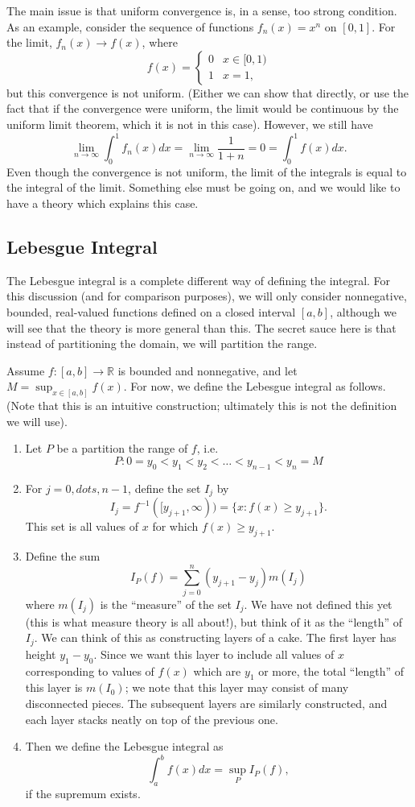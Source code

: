 \documentclass[12pt]{amsart}         %
\theoremstyle{remark}
\newcommand{\R}{\mathbb{R}}
\begin{document}
The main issue is that uniform convergence is, in a sense, too strong condition. As an example, consider the sequence of functions $f_n(x) = x^n$ on $[0, 1]$. For the limit, $f_n(x) \rightarrow f(x)$, where
\[
f(x) = \begin{cases}
0 & x \in [0, 1) \\
1 & x = 1,
\end{cases}
\]
but this convergence is not uniform. (Either we can show that directly, or use the fact that if the convergence were uniform, the limit would be continuous by the uniform limit theorem, which it is not in this case). However, we still have
\[
\lim_{n \rightarrow \infty} \int_0^1 f_n(x) dx = \lim_{n \rightarrow \infty} \frac{1}{1+n} = 0 = \int_0^1 f(x) dx.
\]
Even though the convergence is not uniform, the limit of the integrals is equal to the integral of the limit. Something else must be going on, and we would like to have a theory which explains this case.

\subsection{Lebesgue Integral}

The Lebesgue integral is a complete different way of defining the integral. For this discussion (and for comparison purposes), we will only consider nonnegative, bounded, real-valued functions defined on a closed interval $[a, b]$, although we will see that the theory is more general than this. The secret sauce here is that instead of partitioning the domain, we will partition the range.

Assume $f:[a,b] \rightarrow \R$ is bounded and nonnegative, and let $M = \sup_{x \in [a,b]} f(x)$. For now, we define the Lebesgue integral as follows. (Note that this is an intuitive construction; ultimately this is not the definition we will use).
\begin{enumerate}
\item Let $P$ be a partition the range of $f$, i.e.
\[
P : 0 = y_0 < y_1 < y_2 < \dots < y_{n-1} < y_n = M
\]
\item For $j = 0, dots, n-1$, define the set $I_j$ by
\[
I_j = f^{-1}([y_{j+1}, \infty)) = \{ x : f(x) \geq y_{j+1} \}.
\]
This set is all values of $x$ for which $f(x) \geq y_{j+1}$.
\item Define the sum
\[
I_P(f) = \sum_{j=0}^{n}(y_{j+1}-y_{j})m(I_j)
\]
where $m(I_j)$ is the ``measure'' of the set $I_j$. We have not defined this yet (this is what measure theory is all about!), but think of it as the ``length'' of $I_j$.  We can think of this as constructing layers of a cake. The first layer has height $y_1 - y_0$. Since we want this layer to include all values of $x$ corresponding to values of $f(x)$ which are $y_1$ or more, the total ``length'' of this layer is $m(I_0)$; we note that this layer may consist of many disconnected pieces. The subsequent layers are similarly constructed, and each layer stacks neatly on top of the previous one.

\item Then we define the Lebesgue integral as
\[
\int_{a}^{b}f(x)dx = \sup_P I_P(f),
\]
if the supremum exists.
\end{enumerate}
\end{document}
